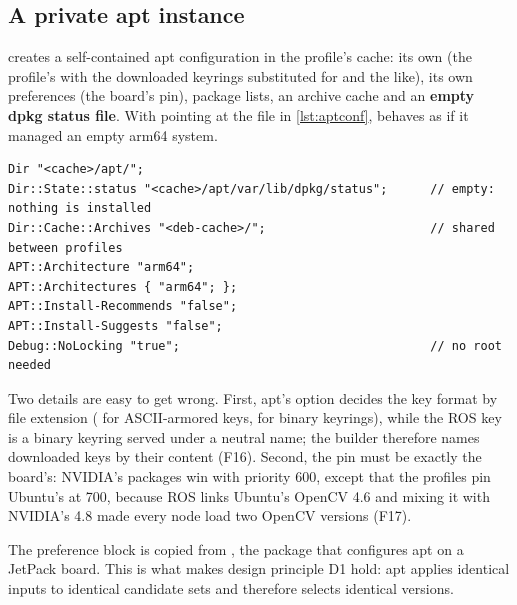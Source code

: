 \documentclass[11pt,a4paper]{article}
\newcommand{\codeb}[1]{\texttt{\detokenize{#1}}}      %
\newcommand{\finding}[1]{\textsf{\small F#1}}
\begin{document}
\subsection{A private apt instance}
 creates a self-contained apt configuration in the profile's cache: its own 
(the profile's  with the downloaded keyrings substituted for \codeb{{nvidia_key}} and the like), its
own preferences (the board's pin), package lists, an archive cache and an \textbf{empty dpkg status file}. With
 pointing at the file in \cref{lst:aptconf},  behaves as if it managed an empty
arm64 system.

\begin{lstlisting}[caption={Configuration of the private apt instance (generated).}, label={lst:aptconf}]
Dir "<cache>/apt/";
Dir::State::status "<cache>/apt/var/lib/dpkg/status";      // empty: nothing is installed
Dir::Cache::Archives "<deb-cache>/";                       // shared between profiles
APT::Architecture "arm64";
APT::Architectures { "arm64"; };
APT::Install-Recommends "false";
APT::Install-Suggests "false";
Debug::NoLocking "true";                                   // no root needed
\end{lstlisting}

Two details are easy to get wrong. First, apt's  option decides the key format by file extension
( for ASCII-armored keys,  for binary keyrings), while the ROS key is a binary keyring served
under a neutral name; the builder therefore names downloaded keys by their content (\finding{16}). Second, the pin
must be exactly the board's: NVIDIA's packages win with priority 600, except that the profiles pin Ubuntu's
 at 700, because ROS  links Ubuntu's OpenCV 4.6 and mixing it with NVIDIA's 4.8
made every  node load two OpenCV versions (\finding{17}).

\begin{jxbtip}
The preference block is copied from , the package that configures apt on a JetPack
board. This is what makes design principle D1 hold: apt applies identical inputs to identical candidate sets and
therefore selects identical versions.
\end{jxbtip}
\end{document}
